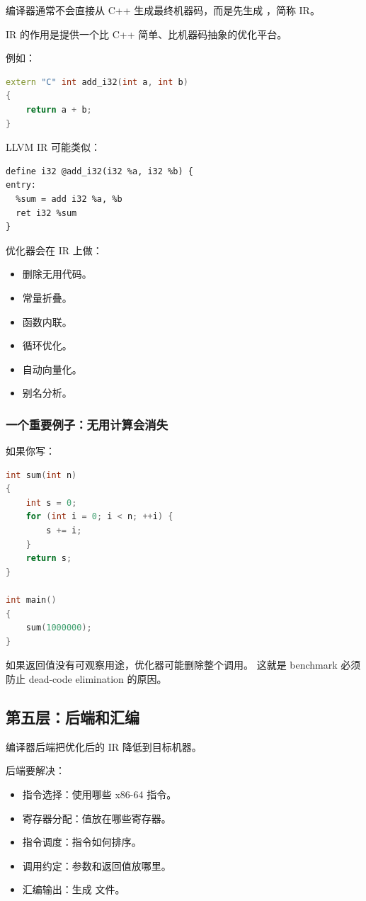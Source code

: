 编译器通常不会直接从 C++ 生成最终机器码，而是先生成 ，简称 IR。

IR 的作用是提供一个比 C++ 简单、比机器码抽象的优化平台。

例如：

\begin{lstlisting}[language=C++]
extern "C" int add_i32(int a, int b)
{
    return a + b;
}
\end{lstlisting}

LLVM IR 可能类似：

\begin{lstlisting}
define i32 @add_i32(i32 %a, i32 %b) {
entry:
  %sum = add i32 %a, %b
  ret i32 %sum
}
\end{lstlisting}

优化器会在 IR 上做：

\begin{itemize}
  \item 删除无用代码。
  \item 常量折叠。
  \item 函数内联。
  \item 循环优化。
  \item 自动向量化。
  \item 别名分析。
\end{itemize}

\subsubsection{一个重要例子：无用计算会消失}

如果你写：

\begin{lstlisting}[language=C++]
int sum(int n)
{
    int s = 0;
    for (int i = 0; i < n; ++i) {
        s += i;
    }
    return s;
}

int main()
{
    sum(1000000);
}
\end{lstlisting}

如果返回值没有可观察用途，优化器可能删除整个调用。  
这就是 benchmark 必须防止 dead-code elimination 的原因。

\subsection{第五层：后端和汇编}

编译器后端把优化后的 IR 降低到目标机器。

后端要解决：

\begin{itemize}
  \item 指令选择：使用哪些 x86-64 指令。
  \item 寄存器分配：值放在哪些寄存器。
  \item 指令调度：指令如何排序。
  \item 调用约定：参数和返回值放哪里。
  \item 汇编输出：生成  文件。
\end{itemize}

